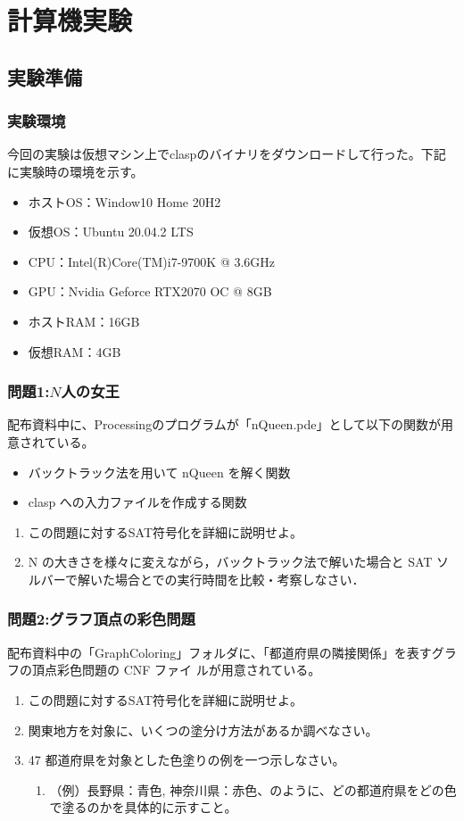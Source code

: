 \documentclass[dvipdfmx]{jsarticle}
\begin{document}
\section{計算機実験}
\subsection{実験準備}
  \subsubsection{実験環境}
  今回の実験は仮想マシン上でclaspのバイナリをダウンロードして行った。下記に実験時の環境を示す。
  \begin{itemize}
    \item ホストOS：Window10 Home 20H2
    \item 仮想OS：Ubuntu 20.04.2 LTS
    \item CPU：Intel(R)Core(TM)i7-9700K @ 3.6GHz
    \item GPU：Nvidia Geforce RTX2070 OC @ 8GB
    \item ホストRAM：16GB
    \item 仮想RAM：4GB
  \end{itemize}
\subsubsection{問題1:$N$人の女王}
配布資料中に、Processingのプログラムが「nQueen.pde」として以下の関数が用意されている。
\begin{itemize}
  \item バックトラック法を用いて nQueen を解く関数
  \item clasp への入力ファイルを作成する関数
\end{itemize}
\begin{enumerate}
  \item この問題に対するSAT符号化を詳細に説明せよ。
  \item N の大きさを様々に変えながら，バックトラック法で解いた場合と SAT ソルバーで解いた場合とでの実行時間を比較・考察しなさい．
\end{enumerate}
\subsubsection{問題2:グラフ頂点の彩色問題}
配布資料中の「GraphColoring」フォルダに、「都道府県の隣接関係」を表すグラフの頂点彩色問題の CNF ファイ
ルが用意されている。
\begin{enumerate}
  \item この問題に対するSAT符号化を詳細に説明せよ。
  \item 関東地方を対象に、いくつの塗分け方法があるか調べなさい。
  \item 47 都道府県を対象とした色塗りの例を一つ示しなさい。
  \begin{enumerate}
    \item （例）長野県：青色, 神奈川県：赤色、のように、どの都道府県をどの色で塗るのかを具体的に示すこと。
  \end{enumerate}
\end{enumerate}
\end{document}
